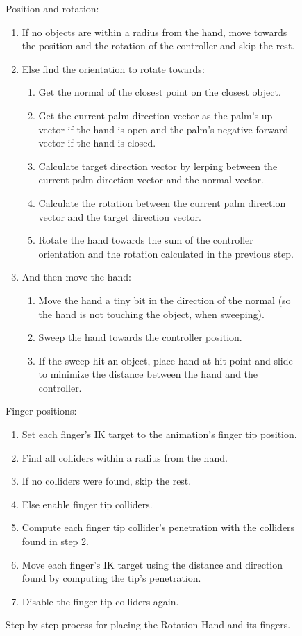 \begin{figure}[H]
\small
Position and rotation:
\begin{enumerate}[noitemsep]
\item If no objects are within a radius from the hand, move towards the position and the rotation of the controller and skip the rest.
\item Else find the orientation to rotate towards:
\begin{enumerate}[noitemsep]
\item Get the normal of the closest point on the closest object.
\item Get the current palm direction vector as the palm's up vector if the hand is open and the palm's negative forward vector if the hand is closed.
\item Calculate target direction vector by lerping between the current palm direction vector and the normal vector.
\item Calculate the rotation between the current palm direction vector and the target direction vector.
\item Rotate the hand towards the sum of the controller orientation and the rotation calculated in the previous step.
\end{enumerate}
\item And then move the hand:
\begin{enumerate}[noitemsep]
\item Move the hand a tiny bit in the direction of the normal (so the hand is not touching the object, when sweeping).
\item Sweep the hand towards the controller position.
\item If the sweep hit an object, place hand at hit point and slide to minimize the distance between the hand and the controller.
\end{enumerate}
\end{enumerate}
Finger positions:
\begin{enumerate}[noitemsep]
\item Set each finger's IK target to the animation's finger tip position.
\item Find all colliders within a radius from the hand.
\item If no colliders were found, skip the rest.
\item Else enable finger tip colliders.
\item Compute each finger tip collider's penetration with the colliders found in step 2.
\item Move each finger's IK target using the distance and direction found by computing the tip's penetration.
\item Disable the finger tip colliders again.
\end{enumerate}
\caption{Step-by-step process for placing the Rotation Hand and its fingers.}
\label{fig:stepByStepRotationHand}
\end{figure}

